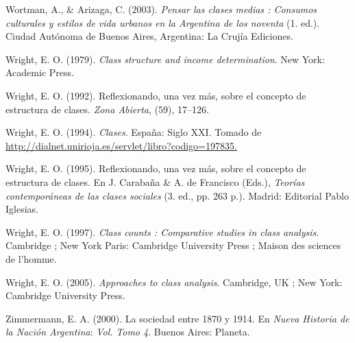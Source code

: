 \documentclass[
]{article}
\newlength{\cslhangindent}
\newlength{\cslentryspacingunit} %
\newenvironment{CSLReferences}[2] %
 {%
  \setlength{\parindent}{0pt}
  \ifodd #1
  \let\oldpar\par
  \def\par{\hangindent=\cslhangindent\oldpar}
  \fi
  \setlength{\parskip}{#2\cslentryspacingunit}
 }%
 {}
\begin{document}
\begin{CSLReferences}{1}{0}
\leavevmode{}%
Wortman, A., \& Arizaga, C. (2003). \emph{Pensar las clases medias : Consumos culturales y estilos de vida urbanos en la {Argentina} de los noventa} (1. ed.). Ciudad Autónoma de Buenos Aires, Argentina: La Crujía Ediciones.

\leavevmode{}%
Wright, E. O. (1979). \emph{Class structure and income determination}. New York: Academic Press.

\leavevmode{}%
Wright, E. O. (1992). Reflexionando, una vez más, sobre el concepto de estructura de clases. \emph{Zona Abierta}, (59), 17--126.

\leavevmode{}%
Wright, E. O. (1994). \emph{Clases}. España: Siglo XXI. Tomado de \href{http://dialnet.unirioja.es/servlet/libro?codigo=197835}{http://dialnet.unirioja.es/servlet/libro?codigo=197835.}

\leavevmode{}%
Wright, E. O. (1995). Reflexionando, una vez más, sobre el concepto de estructura de clases. En J. Carabaña \& A. de Francisco (Eds.), \emph{Teorías contemporáneas de las clases sociales} (3. ed., pp. 263 p.). Madrid: Editorial Pablo Iglesias.

\leavevmode{}%
Wright, E. O. (1997). \emph{Class counts : Comparative studies in class analysis}. Cambridge ; New York Paris: Cambridge University Press ; Maison des sciences de l'homme.

\leavevmode{}%
Wright, E. O. (2005). \emph{Approaches to class analysis}. Cambridge, UK ; New York: Cambridge University Press.

\leavevmode{}%
Zimmermann, E. A. (2000). La sociedad entre 1870 y 1914. En \emph{Nueva {Historia} de la {Nación} {Argentina}}: \emph{Vol.} \emph{Tomo 4}. Buenos Aires: Planeta.

\end{CSLReferences}
\end{document}
